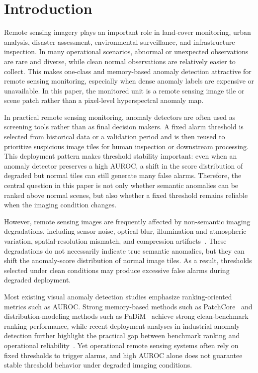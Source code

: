 \documentclass[remotesensing,article,submit,pdftex,moreauthors]{Definitions/mdpi}
\begin{document}
\section{Introduction}
Remote sensing imagery plays an important role in land-cover monitoring, urban analysis, disaster assessment, environmental surveillance, and infrastructure inspection. In many operational scenarios, abnormal or unexpected observations are rare and diverse, while clean normal observations are relatively easier to collect. This makes one-class and memory-based anomaly detection attractive for remote sensing monitoring, especially when dense anomaly labels are expensive or unavailable. In this paper, the monitored unit is a remote sensing image tile or scene patch rather than a pixel-level hyperspectral anomaly map.

In practical remote sensing monitoring, anomaly detectors are often used as screening tools rather than as final decision makers. A fixed alarm threshold is selected from historical data or a validation period and is then reused to prioritize suspicious image tiles for human inspection or downstream processing. This deployment pattern makes threshold stability important: even when an anomaly detector preserves a high AUROC, a shift in the score distribution of degraded but normal tiles can still generate many false alarms. Therefore, the central question in this paper is not only whether semantic anomalies can be ranked above normal scenes, but also whether a fixed threshold remains reliable when the imaging condition changes.

However, remote sensing images are frequently affected by non-semantic imaging degradations, including sensor noise, optical blur, illumination and atmospheric variation, spatial-resolution mismatch, and compression artifacts~\cite{robustness,rsrobustsurvey,reobench,satanomreview}. These degradations do not necessarily indicate true semantic anomalies, but they can shift the anomaly-score distribution of normal image tiles. As a result, thresholds selected under clean conditions may produce excessive false alarms during degraded deployment.

Most existing visual anomaly detection studies emphasize ranking-oriented metrics such as AUROC. Strong memory-based methods such as PatchCore~\cite{patchcore} and distribution-modeling methods such as PaDiM~\cite{padim} achieve strong clean-benchmark ranking performance, while recent deployment analyses in industrial anomaly detection further highlight the practical gap between benchmark ranking and operational reliability~\cite{bestpractices}. Yet operational remote sensing systems often rely on fixed thresholds to trigger alarms, and high AUROC alone does not guarantee stable threshold behavior under degraded imaging conditions.
\end{document}
